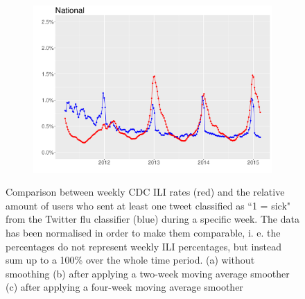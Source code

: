 \documentclass[11pt, a4paper,twoside]{report}\usepackage[]{graphicx}\usepackage[]{color}
\begin{document}
\begin{figure}[H]
  \begin{subfigure}[t]{0.6\textwidth}
  \includegraphics[width=1\linewidth,height=0.5\linewidth]{cdc_twitter_comp_nat_ma4_user.pdf}
  \caption{}
  \end{subfigure}
  \caption{Comparison between weekly CDC ILI rates (red) and the relative amount of users who sent at least one tweet classified as ``1 = sick" from the Twitter flu classifier (blue) during a specific week. The data has been normalised in order to make them comparable, i. e. the percentages do not represent weekly ILI percentages, but instead sum up to a 100\% over the whole time period. (a) without smoothing (b) after applying a two-week moving average smoother (c) after applying a four-week moving average smoother}
  \label{fig:cdc_tw_comp_nat_user}
\end{figure}
\end{document}
